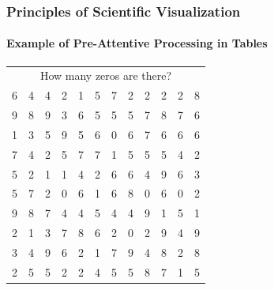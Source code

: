 \documentclass[10pt]{beamer}
\begin{document}
\begin{frame}
\frametitle{Principles of Scientific Visualization}
\framesubtitle{Example of Pre-Attentive Processing in Tables}

{\scriptsize
\begin{center}
\begin{tabular}{cccccccccccc}
\multicolumn{12}{c}{How many zeros are there?}\\
6     & 4    & 4    & 2    & 1    & 5    & 7    & 2    & 2    & 2    & 2    & 8    \\
9     & 8    & 9    & 3    & 6    & 5    & 5    & 5    & 7    & 8    & 7    & 6    \\
1     & 3    & 5    & 9    & 5    & 6    & 0    & 6    & 7    & 6    & 6    & 6    \\
7     & 4    & 2    & 5    & 7    & 7    & 1    & 5    & 5    & 5    & 4    & 2   \\
5     & 2    & 1    & 1    & 4    & 2    & 6    & 6    & 4    & 9    & 6    & 3    \\
5     & 7    & 2    & 0    & 6    & 1    & 6    & 8    & 0    & 6    & 0    & 2    \\
9     & 8    & 7    & 4    & 4    & 5    & 4    & 4    & 9    & 1    & 5    & 1    \\
2     & 1    & 3    & 7    & 8    & 6    & 2    & 0    & 2    & 9    & 4    & 9    \\
3     & 4    & 9    & 6    & 2    & 1    & 7    & 9    & 4    & 8    & 2    & 8    \\
2     & 5    & 5    & 2    & 2    & 4    & 5    & 5    & 8    & 7    & 1    & 5    \\
\end{tabular}
\end{center}
}


\end{frame}
\end{document}
